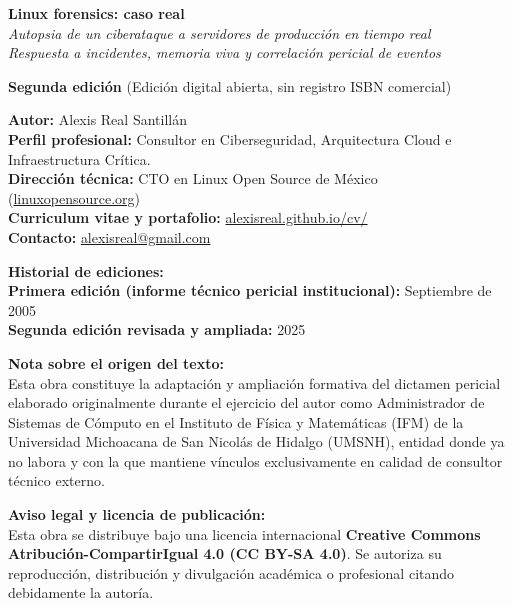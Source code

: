 \thispagestyle{empty}
\vspace*{\fill}

{\footnotesize
\noindent
\textbf{Linux forensics: caso real}\\
\textit{Autopsia de un ciberataque a servidores de producción en tiempo real}\\
\textit{Respuesta a incidentes, memoria viva y correlación pericial de eventos}

\vspace{1.0em}
\noindent
\textbf{Segunda edición} (Edición digital abierta, sin registro ISBN comercial)

\vspace{0.8em}
\noindent
\textbf{Autor:} Alexis Real Santillán\\
\textbf{Perfil profesional:} Consultor en Ciberseguridad, Arquitectura Cloud e Infraestructura Crítica.\\
\textbf{Dirección técnica:} CTO en Linux Open Source de México (\href{https://linuxopensource.org}{linuxopensource.org})\\
\textbf{Curriculum vitae y portafolio:} \href{https://alexisreal.github.io/cv/}{alexisreal.github.io/cv/}\\
\textbf{Contacto:} \href{mailto:alexisreal@gmail.com}{alexisreal@gmail.com}

\vspace{1.0em}
\noindent
\textbf{Historial de ediciones:}\\
\textbf{Primera edición (informe técnico pericial institucional):} Septiembre de 2005\\
\textbf{Segunda edición revisada y ampliada:} 2025

\vspace{1.0em}
\noindent
\textbf{Nota sobre el origen del texto:}\\
Esta obra constituye la adaptación y ampliación formativa del dictamen pericial elaborado originalmente durante el ejercicio del autor como Administrador de Sistemas de Cómputo en el Instituto de Física y Matemáticas (IFM) de la Universidad Michoacana de San Nicolás de Hidalgo (UMSNH), entidad donde ya no labora y con la que mantiene vínculos exclusivamente en calidad de consultor técnico externo.

\vspace{1.0em}
\noindent
\textbf{Aviso legal y licencia de publicación:}\\
Esta obra se distribuye bajo una licencia internacional \textbf{Creative Commons Atribución-CompartirIgual 4.0 (CC BY-SA 4.0)}. Se autoriza su reproducción, distribución y divulgación académica o profesional citando debidamente la autoría.

}
